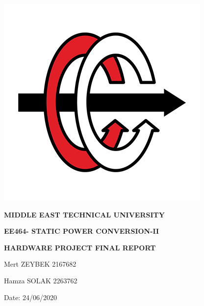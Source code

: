 \documentclass{article}
\date{}
\newcommand\tab[1][1cm]{\hspace*{#1}}
\begin{document}
\begin{figure}[!tp]
\vspace{-10mm}
\includegraphics[scale=0.8]{ee.png}


\vfil
\hfil \Large \bf MIDDLE EAST TECHNICAL UNIVERSITY
 \hfil
\vfil

\vspace{5mm}
\vfil
\hfil \large \bf  EE464- STATIC POWER CONVERSION-II
 \hfil
\vfil

\vspace{5mm}
\vfil
\hfil \large \bf HARDWARE PROJECT FINAL REPORT \hfil
\vfil
\bf

\vspace{23mm}
Mert ZEYBEK    \tab\tab 2167682


Hamza SOLAK \tab\tab2263762


\vspace{5mm}
\small Date: 24/06/2020


\end{figure}

\newpage

\tab\tab
\end{document}
